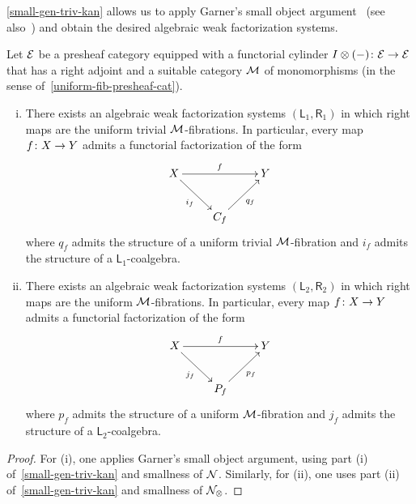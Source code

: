 \documentclass[reqno,10pt,a4paper,oneside,draft]{amsart}
\begin{document}
\cref{small-gen-triv-kan} allows us to apply Garner's small object argument~\cite[Theorem~4.4]{garner:small-object-argument} (see 
also~\cite[Proposition~16]{bourke-garner-I}) and obtain the desired algebraic weak factorization systems.

\begin{theorem} \label{thm:sset-cset-nwfs} Let $\catE$ be a presheaf category
equipped with a functorial cylinder $I \otimes (-) \co \catE \to \catE$ that has a right adjoint
and a suitable category $\cal{M}$ of monomorphisms (in the sense of~\cref{uniform-fib-presheaf-cat}).
\begin{enumerate}[(i)]
\item There exists an algebraic weak factorization systems $(\mathsf{L}_1, \mathsf{R}_1)$ in which right maps are the uniform trivial $\cal{M}$-fibrations.
In particular, every map $f \co X \to Y$ admits a functorial factorization of the form
\[
\xymatrix{
  X
  \ar[rr]^{f}
  \ar[dr]_{i_f}
&&
  Y
\\&
  C_f
  \ar[ur]_{q_f}
}
\]
where $q_f$ admits the structure of a uniform trivial $\cal{M}$-fibration and $i_f$ admits the structure of a $\mathsf{L}_1$-coalgebra.
\item There exists an algebraic weak factorization systems $(\mathsf{L}_2, \mathsf{R}_2)$ in which right maps are the uniform $\cal{M}$-fibrations.
In particular, every map $f \co X \to Y$ admits a functorial factorization of the form
\[
\xymatrix{
  X
  \ar[rr]^{f}
  \ar[dr]_{j_f}
&&
  Y
\\&
  P_f
  \ar[ur]_{p_f}
}
\]
where $p_f$ admits the structure of a uniform $\cal{M}$-fibration and $j_f$ admits the structure of a $\mathsf{L}_2$-coalgebra.
\end{enumerate}
\end{theorem}

\begin{proof} For (i), one applies Garner's small object argument, using  part (i) of~\cref{small-gen-triv-kan} and smallness of $\cal{N}$.
Similarly, for (ii), one uses part (ii) of~\cref{small-gen-triv-kan} and smallness of $\cal{N}_\otimes$.
\end{proof} 
\end{document}
